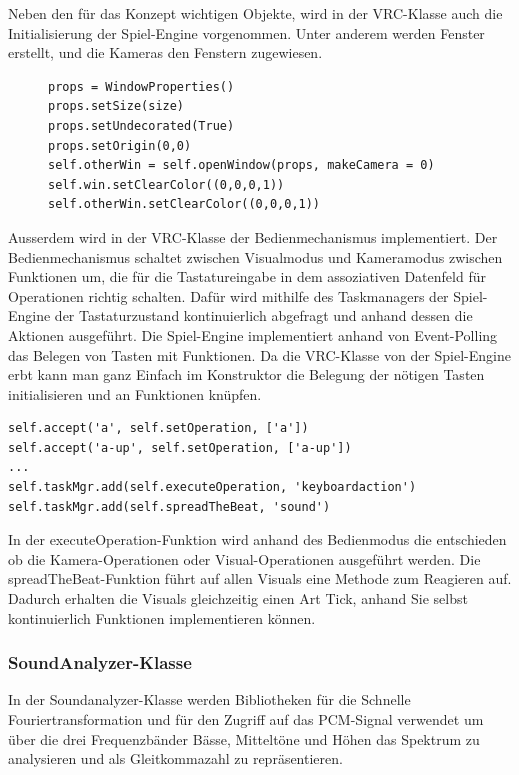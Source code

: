 Neben den f\"ur das Konzept wichtigen Objekte, wird in der VRC-Klasse auch die Initialisierung der Spiel-Engine
vorgenommen. Unter anderem werden Fenster erstellt, und die Kameras den Fenstern zugewiesen.

\begin{figure}
\begin{lstlisting}
props = WindowProperties()
props.setSize(size)
props.setUndecorated(True)
props.setOrigin(0,0)
self.otherWin = self.openWindow(props, makeCamera = 0)
self.win.setClearColor((0,0,0,1))
self.otherWin.setClearColor((0,0,0,1))
\end{lstlisting}
\end{figure}

Ausserdem wird in der VRC-Klasse der Bedienmechanismus implementiert. Der Bedienmechanismus schaltet zwischen
Visualmodus und Kameramodus zwischen Funktionen um, die f\"ur die Tastatureingabe in dem assoziativen Datenfeld
f\"ur Operationen richtig schalten. Daf\"ur wird mithilfe des Taskmanagers der Spiel-Engine der Tastaturzustand
kontinuierlich abgefragt und anhand dessen die Aktionen ausgef\"uhrt.
Die Spiel-Engine implementiert anhand von Event-Polling das Belegen
von Tasten mit Funktionen. 
Da die VRC-Klasse von der Spiel-Engine erbt kann man ganz Einfach im Konstruktor die Belegung
der n\"otigen Tasten initialisieren und an Funktionen kn\"upfen.

\begin{lstlisting}
self.accept('a', self.setOperation, ['a'])
self.accept('a-up', self.setOperation, ['a-up'])
...
self.taskMgr.add(self.executeOperation, 'keyboardaction')
self.taskMgr.add(self.spreadTheBeat, 'sound')
\end{lstlisting}

In der executeOperation-Funktion wird anhand des Bedienmodus die entschieden ob die Kamera-Operationen oder
Visual-Operationen ausgef\"uhrt werden. Die spreadTheBeat-Funktion f\"uhrt auf allen Visuals eine Methode zum
Reagieren auf. Dadurch erhalten die Visuals gleichzeitig einen Art Tick, anhand Sie selbst kontinuierlich 
Funktionen implementieren k\"onnen.

\subsubsection{SoundAnalyzer-Klasse}

In der Soundanalyzer-Klasse werden Bibliotheken f\"ur die Schnelle Fouriertransformation und f\"ur den Zugriff
auf das PCM-Signal verwendet um \"uber die drei Frequenzb\"ander B\"asse, Mittelt\"one und H\"ohen das Spektrum
zu analysieren und als Gleitkommazahl zu repr\"asentieren.



